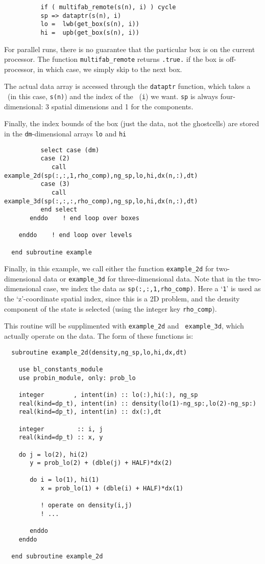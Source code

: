 \begin{verbatim}
          if ( multifab_remote(s(n), i) ) cycle
          sp => dataptr(s(n), i)
          lo =  lwb(get_box(s(n), i))
          hi =  upb(get_box(s(n), i))
\end{verbatim}

\noindent For parallel runs, there is no guarantee that the particular
box is on the current processor.  The function {\tt multifab\_remote}
returns {\tt .true.} if the box is off-processor, in which case, we 
simply skip to the next box.

The actual data array is accessed through the {\tt dataptr} function,
which takes a \multifab\ (in this case, {\tt s(n)}) and the index of
the \boxtype\ ({\tt i}) we want.  {\tt sp} is always four-dimensional:
3 spatial dimensions and 1 for the components.

Finally, the index bounds of the box (just the data, not the ghostcells) are 
stored in the {\tt dm}-dimensional arrays {\tt lo} and {\tt hi}

\begin{verbatim}
          select case (dm)
          case (2)
             call example_2d(sp(:,:,1,rho_comp),ng_sp,lo,hi,dx(n,:),dt)
          case (3)
             call example_3d(sp(:,:,:,rho_comp),ng_sp,lo,hi,dx(n,:),dt)
          end select
       enddo    ! end loop over boxes

    enddo    ! end loop over levels

  end subroutine example
\end{verbatim}

\noindent Finally, in this example, we call either the function
{\tt example\_2d} for two-dimensional data or {\tt example\_3d}
for three-dimensional data.  Note that in the two-dimensional
case, we index the data as {\tt sp(:,:,1,rho\_comp)}.  Here a
`{\tt 1}' is used as the `z'-coordinate spatial index, since this
is a 2D problem, and the density component of the state is selected
(using the integer key {\tt rho\_comp}).

This routine will be supplimented with {\tt example\_2d} and {\tt
example\_3d}, which actually operate on the data.  The form of 
these functions is:

\begin{verbatim}
  subroutine example_2d(density,ng_sp,lo,hi,dx,dt)

    use bl_constants_module
    use probin_module, only: prob_lo

    integer        , intent(in) :: lo(:),hi(:), ng_sp
    real(kind=dp_t), intent(in) :: density(lo(1)-ng_sp:,lo(2)-ng_sp:)
    real(kind=dp_t), intent(in) :: dx(:),dt

    integer         :: i, j
    real(kind=dp_t) :: x, y

    do j = lo(2), hi(2)
       y = prob_lo(2) + (dble(j) + HALF)*dx(2)

       do i = lo(1), hi(1)
          x = prob_lo(1) + (dble(i) + HALF)*dx(1)

          ! operate on density(i,j)
          ! ...

       enddo
    enddo

  end subroutine example_2d
\end{verbatim}

